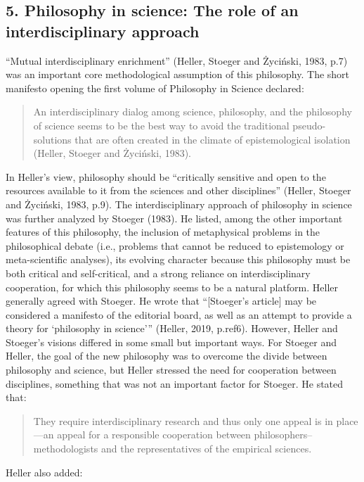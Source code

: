 \documentclass[a4paper]{article}
\begin{document}
\subsection{5. Philosophy in science: The role of an interdisciplinary approach}
“Mutual interdisciplinary enrichment” (Heller, Stoeger and Życiński, 1983, p.7) was an important core methodological
assumption of this philosophy. The short manifesto opening the first volume of Philosophy in Science declared:

\begin{quotation}
An interdisciplinary dialog among science, philosophy, and the philosophy of science seems to be the best way to avoid
the traditional pseudo-solutions that are often created in the climate of epistemological isolation (Heller, Stoeger
and Życiński, 1983).

\end{quotation}
In Heller’s view, philosophy should be “critically sensitive and open to the resources available to it from the sciences
and other disciplines” (Heller, Stoeger and Życiński, 1983, p.9). The interdisciplinary approach of philosophy in
science was further analyzed by Stoeger (1983). He listed, among the other important features of this philosophy, the
inclusion of metaphysical problems in the philosophical debate (i.e., problems that cannot be reduced to epistemology
or meta-scientific analyses), its evolving character because this philosophy must be both critical and self-critical,
and a strong reliance on interdisciplinary cooperation, for which this philosophy seems to be a natural platform.
Heller generally agreed with Stoeger. He wrote that “[Stoeger’s article] may be considered a manifesto of the editorial
board, as well as an attempt to provide a theory for ‘philosophy in science’” (Heller, 2019, p.ref6). However, Heller
and Stoeger’s visions differed in some small but important ways. For Stoeger and Heller, the goal of the new philosophy
was to overcome the divide between philosophy and science, but Heller stressed the need for cooperation between
disciplines, something that was not an important factor for Stoeger. He stated that: 

\begin{quotation}
They require interdisciplinary research and thus only one appeal is in place—an appeal for a responsible cooperation
between philosophers–methodologists and the representatives of the empirical sciences.

\end{quotation}
Heller also added:
\end{document}

